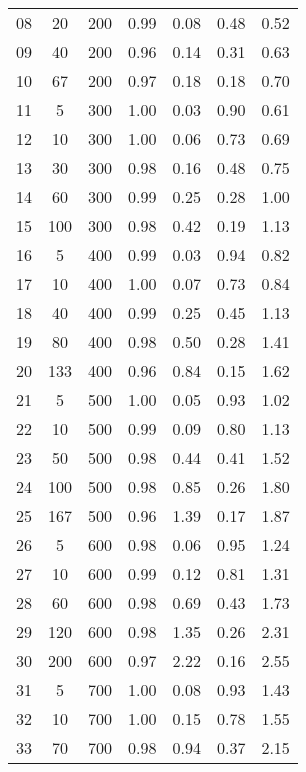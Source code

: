 \documentclass[11pt]{article}
\begin{document}
\begin{table}[]
\begin{tabular}{ccccccc}
			08 & 20 & 200 & 0.99 & 0.08 & 0.48 & 0.52 \\
			09 & 40 & 200 & 0.96 & 0.14 & 0.31 & 0.63 \\
			10 & 67 & 200 & 0.97 & 0.18 & 0.18 & 0.70 \\
			\rowcolor[HTML]{EFEFEF} 
			11 & 5 & 300 & 1.00 & 0.03 & 0.90 & 0.61 \\ 
			\rowcolor[HTML]{EFEFEF} 
			12 & 10 & 300 & 1.00 & 0.06 & 0.73 & 0.69 \\ 
			\rowcolor[HTML]{EFEFEF} 
			13 & 30 & 300 & 0.98 & 0.16 & 0.48 & 0.75 \\ 
			\rowcolor[HTML]{EFEFEF} 
			14 & 60 & 300 & 0.99 & 0.25 & 0.28 & 1.00 \\ 
			\rowcolor[HTML]{EFEFEF} 
			15 & 100 & 300 & 0.98 & 0.42 & 0.19 & 1.13 \\
			16 & 5 & 400 & 0.99 & 0.03 & 0.94 & 0.82 \\ 
			17 & 10 & 400 & 1.00 & 0.07 & 0.73 & 0.84 \\ 
			18 & 40 & 400 & 0.99 & 0.25 & 0.45 & 1.13 \\ 
			19 & 80 & 400 & 0.98 & 0.50 & 0.28 & 1.41 \\ 
			20 & 133 & 400 & 0.96 & 0.84 & 0.15 & 1.62 \\ 
			\rowcolor[HTML]{EFEFEF} 
			21 & 5 & 500 & 1.00 & 0.05 & 0.93 & 1.02 \\ 
			\rowcolor[HTML]{EFEFEF} 
			22 & 10 & 500 & 0.99 & 0.09 & 0.80 & 1.13 \\ 
			\rowcolor[HTML]{EFEFEF} 
			23 & 50 & 500 & 0.98 & 0.44 & 0.41 & 1.52 \\ 
			\rowcolor[HTML]{EFEFEF} 
			24 & 100 & 500 & 0.98 & 0.85 & 0.26 & 1.80 \\
			\rowcolor[HTML]{EFEFEF} 
			25 & 167 & 500 & 0.96 & 1.39 & 0.17 & 1.87 \\
			26 & 5 & 600 & 0.98 & 0.06 & 0.95 & 1.24 \\ 
			27 & 10 & 600 & 0.99 & 0.12 & 0.81 & 1.31 \\ 
			28 & 60 & 600 & 0.98 & 0.69 & 0.43 & 1.73 \\ 
			29 & 120 & 600 & 0.98 & 1.35 & 0.26 & 2.31 \\ 
			30 & 200 & 600 & 0.97 & 2.22 & 0.16 & 2.55 \\ 
			\rowcolor[HTML]{EFEFEF} 
			31 & 5 & 700 & 1.00 & 0.08 & 0.93 & 1.43 \\ 
			\rowcolor[HTML]{EFEFEF} 
			32 & 10 & 700 & 1.00 & 0.15 & 0.78 & 1.55 \\ 
			\rowcolor[HTML]{EFEFEF} 
			33 & 70 & 700 & 0.98 & 0.94 & 0.37 & 2.15 \\ 

\end{tabular}
\end{table}
\end{document}
